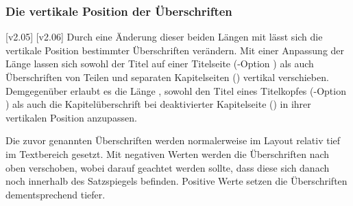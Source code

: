 \begin{Declaration*}{}
\begin{Declaration*}{}
\begin{Declaration*}{}
\subsubsection{Die vertikale Position der Überschriften}
\begin{Declaration}[v2.02]{}
\begin{Declaration}[v2.02]{}
\printdeclarationlist%
%
%
%
[v2.05]
[v2.06]
Durch eine Änderung dieser beiden Längen mit  lässt sich die 
vertikale Position bestimmter Überschriften verändern. Mit einer Anpassung der  
Länge  lassen sich sowohl der Titel auf einer 
Titelseite (\KOMAScript-Option ) als auch Überschriften 
von Teilen und separaten Kapitelseiten () vertikal 
verschieben. Demgegenüber erlaubt es die Länge , sowohl 
den Titel eines Titelkopfes (\KOMAScript-Option ) als 
auch die Kapitelüberschrift bei deaktivierter Kapitelseite 
() in ihrer vertikalen Position anzupassen.

Die zuvor genannten Überschriften werden normalerweise im Layout relativ tief 
im Textbereich gesetzt. Mit negativen Werten werden die Überschriften nach oben 
verschoben, wobei darauf geachtet werden sollte, dass diese sich danach noch 
innerhalb des Satzspiegels befinden. Positive Werte setzen die Überschriften 
dementsprechend tiefer.
%
\end{Declaration}
\end{Declaration}




\end{Declaration*}
\end{Declaration*}
\end{Declaration*}
